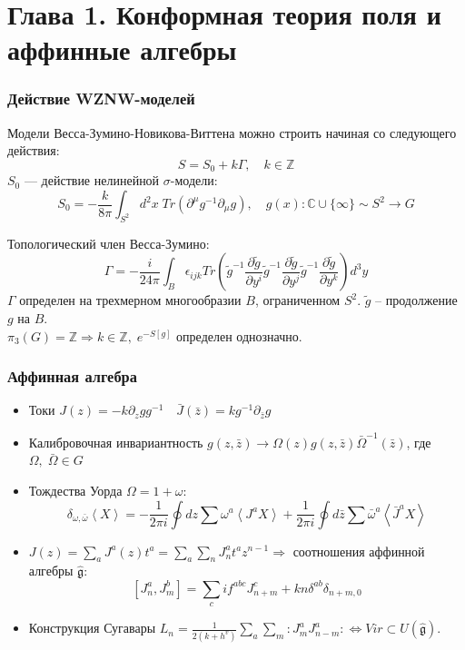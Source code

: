 \documentclass[pdftex]{beamer}
\newcommand{\gfh}{\hat{\mathfrak{g}}}
\theoremstyle{definition} \newtheorem{Def}{Определение}
\begin{document}
\section{Глава 1. Конформная теория поля и аффинные алгебры}
\begin{frame}
  \frametitle{Действие WZNW-моделей}
  Модели Весса-Зумино-Новикова-Виттена можно строить начиная со следующего действия:
  \begin{equation}
    \label{eq:4}
    S=S_0+k\Gamma, \quad k\in \mathbb{Z}
  \end{equation}
 $S_0$ --- действие нелинейной $\sigma$-модели:
\begin{equation}
  \label{eq:5}
  S_0=-\frac{k}{8\pi}\int_{S^2} d^2x\; Tr (\partial^{\mu}g^{-1}\partial_{\mu}g),\quad g(x):\mathbb{C}\cup \{\infty\}\sim S^{2}\to G 
\end{equation}

Топологический член Весса-Зумино:
\begin{equation}
  \label{eq:73}
\Gamma= - \frac{i }{24\pi} \int_{B}\epsilon_{ijk} Tr\left(
    \tilde g^{-1}\frac{\partial \tilde g}{\partial y^i}
      \tilde g^{-1}\frac{\partial \tilde g}{\partial y^j}
      \tilde g^{-1}\frac{\partial \tilde g}{\partial y^k}\right) d^3y
\end{equation}
$\Gamma$ определен на трехмерном многообразии $B$, ограниченном $S^{2}$. $\tilde{g}$  -- продолжение $g$ на $B$.\\
$\pi_{3}(G)=\mathbb{Z} \Rightarrow k\in\mathbb{Z}, \; e^{-S[g]}$ определен однозначно.

\end{frame}
\begin{frame}
  \frametitle{Аффинная алгебра}

  \begin{itemize}
  \item   Токи 
    $J(z)= -k \partial_zg g^{-1}\quad \bar J(\bar z)=k g^{-1}\partial_{\bar z}g$

  \item Калибровочная инвариантность $   g(z,\bar z)\to \Omega(z)g(z,\bar z)\bar \Omega^{-1}(\bar z)$,
    где $\Omega,\;\bar \Omega \in G$

  \item Тождества Уорда $\Omega=1+\omega$:
    \begin{equation*}
      \label{eq:87}
      \delta_{\omega,\bar \omega}\left< X \right>=-\frac{1}{2\pi i}\oint dz \sum\omega^a \left< J^a X\right>+
      \frac{1}{2\pi i} \oint d\bar z \sum \bar \omega^a \left< \bar J^a X\right>
    \end{equation*}
  \item  $J(z)=\sum_{a} J^{a}(z) t^{a}=\sum_{a} \sum _{n} J^{a}_{n} t^{a} z^{n-1} \Rightarrow$ соотношения аффинной алгебры $\gfh$: 
    \begin{equation*}
      \left[J^a_n,J^b_m\right]=\sum_c i f^{abc}J^c_{n+m}+kn\delta^{ab}\delta_{n+m,0}
    \end{equation*}
  \item Конструкция Сугавары $  L_n=\frac{1}{2(k+h^v)}\sum\limits_a\sum\limits_m:J^a_m J^a_{n-m}: \Leftrightarrow Vir\subset U(\gfh)$.
  \end{itemize}
\end{frame}
\end{document}
